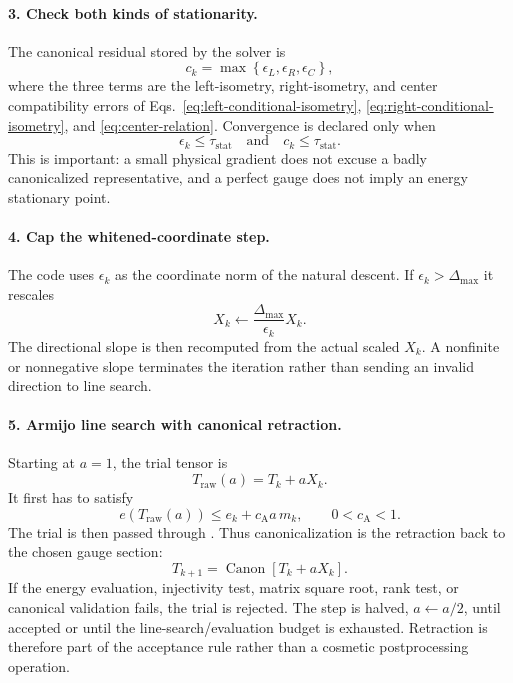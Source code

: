 \documentclass[11pt]{article}
\newcommand{\code}[1]{\texttt{\detokenize{#1}}}
\begin{document}
\paragraph{3. Check both kinds of stationarity.}
The canonical residual stored by the solver is
\begin{equation}
  c_k
  =
  \max\left\{
    \epsilon_L,\epsilon_R,\epsilon_C
  \right\},
  \label{eq:combined-canonical-residual}
\end{equation}
where the three terms are the left-isometry, right-isometry, and center
compatibility errors of
Eqs.~\eqref{eq:left-conditional-isometry},
\eqref{eq:right-conditional-isometry}, and
\eqref{eq:center-relation}.  Convergence is declared only when
\begin{equation}
  \epsilon_k\leq\tau_{\mathrm{stat}}
  \quad\text{and}\quad
  c_k\leq\tau_{\mathrm{stat}}.
  \label{eq:two-part-convergence}
\end{equation}
This is important: a small physical gradient does not excuse a badly
canonicalized representative, and a perfect gauge does not imply an energy
stationary point.

\paragraph{4. Cap the whitened-coordinate step.}
The code uses $\epsilon_k$ as the coordinate norm of the natural descent.  If
$\epsilon_k>\Delta_{\max}$ it rescales
\begin{equation}
  X_k\leftarrow
  \frac{\Delta_{\max}}{\epsilon_k}X_k.
  \label{eq:step-cap}
\end{equation}
The directional slope is then recomputed from the actual scaled $X_k$.  A
nonfinite or nonnegative slope terminates the iteration rather than sending
an invalid direction to line search.

\paragraph{5. Armijo line search with canonical retraction.}
Starting at $a=1$, the trial tensor is
\begin{equation}
  T_{\mathrm{raw}}(a)=T_k+aX_k.
  \label{eq:raw-trial-tensor}
\end{equation}
It first has to satisfy
\begin{equation}
  e\!\left(T_{\mathrm{raw}}(a)\right)
  \leq e_k+c_{\mathrm A}a\,m_k,
  \qquad 0<c_{\mathrm A}<1.
  \label{eq:armijo}
\end{equation}
The trial is then passed through \code{conditional_canonicalize}.  Thus
canonicalization is the retraction back to the chosen gauge section:
\begin{equation}
  T_{k+1}
  =
  \operatorname{Canon}\!\left[T_k+aX_k\right].
  \label{eq:conditional-retraction}
\end{equation}
If the energy evaluation, injectivity test, matrix square root, rank test, or
canonical validation fails, the trial is rejected.  The step is halved,
$a\leftarrow a/2$, until accepted or until the line-search/evaluation budget
is exhausted.  Retraction is therefore part of the acceptance rule rather
than a cosmetic postprocessing operation.
\end{document}
